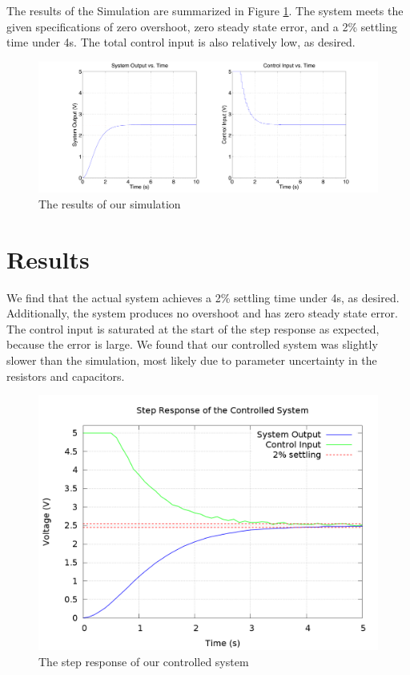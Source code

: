 \documentclass[11pt]{article}
\begin{document}
The results of the Simulation are summarized in Figure \ref{fig:sim_results}.
The system meets the given specifications of zero overshoot, zero steady state error, and a 2\% settling time under 4s.
The total control input is also relatively low, as desired.

\begin{figure}[h]
\centering
\includegraphics[width = 0.95\linewidth]{sim_results}
\caption{The results of our simulation}\label{fig:sim_results}
\end{figure}

\section*{Results}

We find that the actual system achieves a 2\% settling time under 4s, as desired.
Additionally, the system produces no overshoot and has zero steady state error.
The control input is saturated at the start of the step response as expected, because the error is large.
We found that our controlled system was slightly slower than the simulation, most likely due to parameter uncertainty in the resistors and capacitors. 

\begin{figure}[h]
\centering
\includegraphics[width = 0.7\linewidth]{results}
\caption{The step response of our controlled system}\label{fig:results}
\end{figure}
\end{document}
